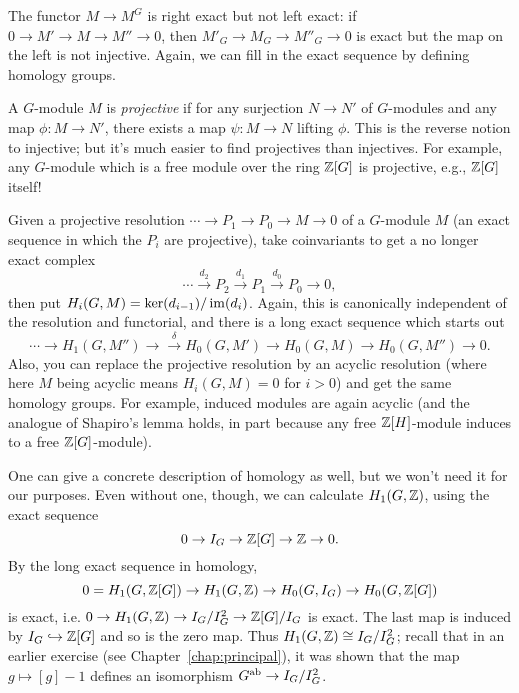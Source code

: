 The functor $M \to M^G$ is right exact but not left exact: if 
$0 \to M' \to M \to M'' \to 0$, then $M'_G \to M_G \to M''_G \to 0$
is exact but the map on the left is not injective. Again, we can fill
in the exact sequence by defining homology groups.

A $G$-module $M$ is \emph{projective} if for any surjection $N \to N'$
of $G$-modules and any map $\phi: M \to N'$, there exists a map
$\psi: M \to N$ lifting $\phi$. This is the reverse notion to injective;
but it's much easier to find projectives than injectives. For example,
any $G$-module which is a free module over the ring $\mathbb{Z}[G]$ is projective,
e.g., $\mathbb{Z}[G]$ itself!

Given a projective resolution $\cdots \to P_1 \to P_0 \to M \to 0$ of
a $G$-module $M$ (an exact sequence in which the $P_i$ are projective), 
take coinvariants to get a no longer exact complex
\[
\cdots \stackrel{d_2}{\to} P_2 \stackrel{d_1}{\to} P_1 \stackrel{d_0}{\to}
P_0 \to 0,
\]
then put $H_i(G, M) = \ker(d_{i-1})/\operatorname{im}(d_i)$. Again, this is canonically
independent of the resolution and functorial, and there is a long
exact sequence which starts out
\[
\cdots \to H_1(G, M'') \to \stackrel{\delta}{\to} H_0(G, M') \to H_0(G, M) \to H_0(G, M'') \to 0.
\]
Also, you can replace the projective resolution by an acyclic resolution
(where here $M$ being acyclic means $H_i(G,M) =0$ for $i>0$) and get
the same homology groups.
For example, induced modules are again acyclic (and the analogue of Shapiro's lemma holds, in part because any free $\mathbb{Z}[H]$-module induces to a free $\mathbb{Z}[G]$-module).

One can give a concrete description of homology as well, but we won't need
it for our purposes.
Even without one, though, we can calculate $H_1(G, \mathbb{Z})$, using the exact
sequence
\[
0 \to I_G \to \mathbb{Z}[G] \to \mathbb{Z} \to 0.
\]
By the long exact sequence in homology,
\[
0 = H_1(G, \mathbb{Z}[G]) \to H_1(G, \mathbb{Z}) \to H_0(G, I_G) \to H_0(G, \mathbb{Z}[G])
\]
is exact, i.e. $0 \to H_1(G, \mathbb{Z}) \to I_G/I_G^2 \to \mathbb{Z}[G]/I_G$ is
exact. The last map is induced by $I_G \hookrightarrow \mathbb{Z}[G]$ and so
is the zero map. Thus $H_1(G, \mathbb{Z}) \cong I_G/I_G^2$;
recall that in an earlier exercise
(see Chapter~\ref{chap:principal}),
it was shown that the map $g \mapsto [g] - 1$ defines an isomorphism $G^{\operatorname{ab}} \to I_G/I_G^2$.


